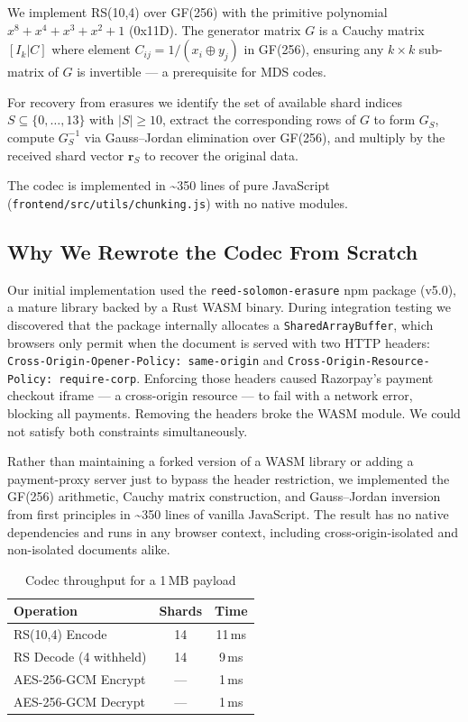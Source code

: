\documentclass[journal]{IEEEtran}
\newcommand{\FileSizeMB}{1\,MB}
\newcommand{\AESEncryptMs}{1\,ms}
\newcommand{\AESDecryptMs}{1\,ms}
\newcommand{\RSEncodeMs}{11\,ms}
\newcommand{\RSDecodeMs}{9\,ms}
\newcommand{\RSShards}{14}
\newcommand{\RSData}{10}
\newcommand{\RSParity}{4}
\begin{document}
We implement RS(\RSData{},\RSParity{}) over GF(256) with the primitive
polynomial $x^8+x^4+x^3+x^2+1$ (0x11D).
%
The generator matrix $G$ is a Cauchy matrix $[I_{k} | C]$ where element
$C_{ij} = 1/(x_i \oplus y_j)$ in GF(256), ensuring any $k \times k$
sub-matrix of $G$ is invertible — a prerequisite for MDS codes.

For recovery from erasures we identify the set of available shard indices
$S \subseteq \{0,\ldots,13\}$ with $|S| \geq 10$, extract the
corresponding rows of $G$ to form $G_S$, compute $G_S^{-1}$ via
Gauss--Jordan elimination over GF(256), and multiply by the received
shard vector $\mathbf{r}_S$ to recover the original data.

The codec is implemented in \textasciitilde{}350 lines of pure JavaScript
(\texttt{frontend/src/utils/chunking.js}) with no native modules.

\subsection{Why We Rewrote the Codec From Scratch}

Our initial implementation used the \texttt{reed-solomon-erasure} npm
package (v5.0), a mature library backed by a Rust WASM binary.
During integration testing we discovered that the package internally
allocates a \texttt{SharedArrayBuffer}, which browsers only permit
when the document is served with two HTTP headers:
\texttt{Cross-Origin-Opener-Policy: same-origin} and
\texttt{Cross-Origin-Resource-Policy: require-corp}.
Enforcing those headers caused Razorpay's payment checkout iframe — a
cross-origin resource — to fail with a network error, blocking all payments.
Removing the headers broke the WASM module.
We could not satisfy both constraints simultaneously.

Rather than maintaining a forked version of a WASM library or adding a
payment-proxy server just to bypass the header restriction, we implemented
the GF(256) arithmetic, Cauchy matrix construction, and Gauss--Jordan
inversion from first principles in \textasciitilde{}350 lines of vanilla
JavaScript. The result has no native dependencies and runs in any browser
context, including cross-origin-isolated and non-isolated documents alike.

\begin{table}[t]
\caption{Codec throughput for a \FileSizeMB{} payload}
\label{tab:codec}
\centering
\begin{tabular}{lcc}
\toprule
Operation & Shards & Time \\
\midrule
RS(\RSData{},\RSParity{}) Encode & \RSShards{} & \RSEncodeMs{} \\
RS Decode (4 withheld) & \RSShards{} & \RSDecodeMs{} \\
AES-256-GCM Encrypt & — & \AESEncryptMs{} \\
AES-256-GCM Decrypt & — & \AESDecryptMs{} \\
\bottomrule
\end{tabular}
\end{table}
\end{document}
